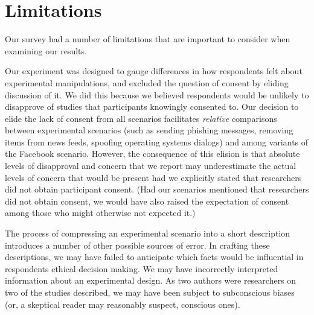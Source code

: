 
\section{Limitations}
Our survey had a number of limitations that are important to consider when examining our results.

Our experiment was designed to gauge differences in how respondents felt about experimental manipulations, and excluded the question of consent by eliding discussion of it.  We did this because we believed respondents would be unlikely to disapprove of studies that participants knowingly consented to.  Our decision to elide the lack of consent from all scenarios facilitates \emph{relative} comparisons between experimental scenarios (such as sending phishing messages, removing items from news feeds, spoofing operating systems dialogs) and among variants of the Facebook scenario.  However, the consequence of this elision is that absolute levels of disapproval and concern that we report may underestimate the actual levels of concern that would be present had we explicitly stated that researchers did not obtain participant consent.  (Had our scenarios mentioned that researchers did not obtain consent, we would have also raised the expectation of consent among those who might otherwise not expected it.)

The process of compressing an experimental scenario into a short description introduces a number of other possible sources of error.  In crafting these descriptions, we may have failed to anticipate which facts would be influential in respondents ethical decision making.  We may have incorrectly interpreted information about an experimental design.  As two authors were researchers on two of the studies described, we may have been subject to subconscious biases (or, a skeptical reader may reasonably suspect, conscious ones).

